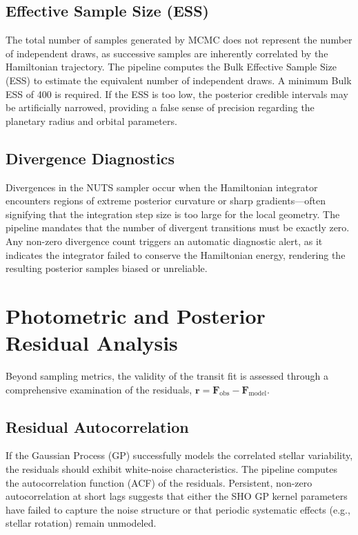\documentclass[12pt,a4paper,oneside]{report}
\begin{document}
\subsection{Effective Sample Size (ESS)}
The total number of samples generated by MCMC does not represent the number of independent draws, as successive samples are inherently correlated by the Hamiltonian trajectory. The pipeline computes the Bulk Effective Sample Size (ESS) to estimate the equivalent number of independent draws. A minimum Bulk ESS of 400 is required. If the ESS is too low, the posterior credible intervals may be artificially narrowed, providing a false sense of precision regarding the planetary radius and orbital parameters.

\subsection{Divergence Diagnostics}
Divergences in the NUTS sampler occur when the Hamiltonian integrator encounters regions of extreme posterior curvature or sharp gradients—often signifying that the integration step size is too large for the local geometry. The pipeline mandates that the number of divergent transitions must be exactly zero. Any non-zero divergence count triggers an automatic diagnostic alert, as it indicates the integrator failed to conserve the Hamiltonian energy, rendering the resulting posterior samples biased or unreliable.

\section{Photometric and Posterior Residual Analysis}
Beyond sampling metrics, the validity of the transit fit is assessed through a comprehensive examination of the residuals, $\boldsymbol{r} = \boldsymbol{F}_{\mathrm{obs}} - \boldsymbol{F}_{\mathrm{model}}$.

\subsection{Residual Autocorrelation}
If the Gaussian Process (GP) successfully models the correlated stellar variability, the residuals should exhibit white-noise characteristics. The pipeline computes the autocorrelation function (ACF) of the residuals. Persistent, non-zero autocorrelation at short lags suggests that either the SHO GP kernel parameters have failed to capture the noise structure or that periodic systematic effects (e.g., stellar rotation) remain unmodeled.
\end{document}
